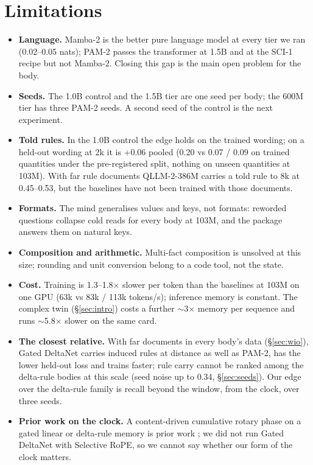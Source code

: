 \documentclass[11pt]{article}
\newcommand{\model}{QLLM-2}
\newcommand{\arch}{PAM-2}
\newcommand{\mamba}{Mamba-2}
\newcommand{\scione}{SCI-1}
\begin{document}
\section{Limitations}
\begin{itemize}[leftmargin=1.4em,itemsep=1pt]
\item \textbf{Language.} \mamba{} is the better pure language model at every tier we ran (0.02--0.05 nats); \arch{} passes the transformer at 1.5B and at the \scione{} recipe but not \mamba. Closing this gap is the main open problem for the body.
\item \textbf{Seeds.} The 1.0B control and the 1.5B tier are one seed per body; the 600M tier has three \arch{} seeds. A second seed of the control is the next experiment.
\item \textbf{Told rules.} In the 1.0B control the edge holds on the trained wording; on a held-out wording at 2k it is +0.06 pooled (0.20 vs 0.07 / 0.09 on trained quantities under the pre-registered split, nothing on unseen quantities at 103M). With far rule documents \model-386M carries a told rule to 8k at 0.45--0.53, but the baselines have not been trained with those documents.
\item \textbf{Formats.} The mind generalises values and keys, not formats: reworded questions collapse cold reads for every body at 103M, and the package answers them on natural keys.
\item \textbf{Composition and arithmetic.} Multi-fact composition is unsolved at this size; rounding and unit conversion belong to a code tool, not the state.
\item \textbf{Cost.} Training is 1.3--1.8$\times$ slower per token than the baselines at 103M on one GPU (63k vs 83k / 113k tokens/s); inference memory is constant. The complex twin (\S\ref{sec:intro}) costs a further $\sim$3$\times$ memory per sequence and runs $\sim$5.8$\times$ slower on the same card.
\item \textbf{The closest relative.} With far documents in every body's data (\S\ref{sec:wio}), Gated DeltaNet carries induced rules at distance as well as \arch, has the lower held-out loss and trains faster; rule carry cannot be ranked among the delta-rule bodies at this scale (seed noise up to 0.34, \S\ref{sec:seeds}). Our edge over the delta-rule family is recall beyond the window, from the clock, over three seeds.
\item \textbf{Prior work on the clock.} A content-driven cumulative rotary phase on a gated linear or delta-rule memory is prior work \citep{movahedi2026selective}; we did not run Gated DeltaNet with Selective RoPE, so we cannot say whether our form of the clock matters.

\end{itemize}
\end{document}
